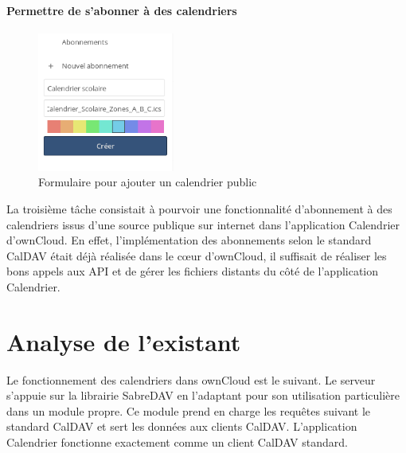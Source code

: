 \documentclass[10pt,a4paper]{report}
\begin{document}
	
	\subsubsection{Permettre de s'abonner à des calendriers}
	
	\begin{figure}
		\begin{center}
			\includegraphics[width=0.40\textwidth]{images/creation_abonnement.png}
		\end{center}
		\caption*{Formulaire pour ajouter un calendrier public}
	\end{figure}
	
	La troisième tâche consistait à pourvoir une fonctionnalité d'abonnement à des calendriers issus d'une source publique sur internet dans l'application Calendrier d'ownCloud. En effet, l'implémentation des abonnements selon le standard CalDAV était déjà réalisée dans le cœur d'ownCloud, il suffisait de réaliser les bons appels aux API et de gérer les fichiers distants du côté de l'application Calendrier.
	
	\chapter{Analyse de l'existant}
	
	Le fonctionnement des calendriers dans ownCloud est le suivant. Le serveur s'appuie sur la librairie SabreDAV en l'adaptant pour son utilisation particulière dans un module propre. Ce module prend en charge les requêtes suivant le standard CalDAV et sert les données aux clients CalDAV.
	L'application Calendrier fonctionne exactement comme un client CalDAV standard.
	
\end{document}
